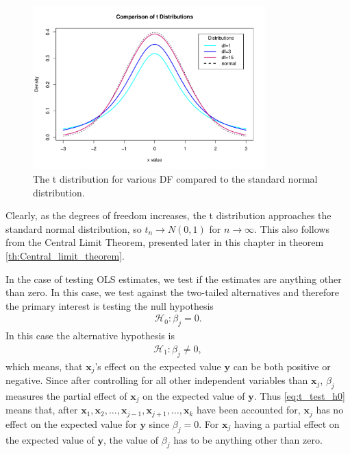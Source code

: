 \begin{figure}[H]
    \centering
    \includegraphics[width = 0.8\textwidth]{figures/t_distribution.pdf}
    \caption{The t distribution for various DF compared to the standard normal distribution.}
    \label{fig:t_distribution}
\end{figure}

Clearly, as the degrees of freedom increases, the t distribution approaches the standard normal distribution, so $t_n \rightarrow N(0,1)$ for $n\rightarrow \infty$. This also follows from the Central Limit Theorem, presented later in this chapter in theorem \ref{th:Central_limit_theorem}. 

In the case of testing OLS estimates, we test if the estimates are anything other than zero. In this case, we test against the two-tailed alternatives and therefore the primary interest is testing the null hypothesis
\begin{align} \label{eq:t_test_h0}
    \mathcal{H}_0:\beta_j=0.
\end{align}
In this case the alternative hypothesis is
\begin{align} \label{eq:t_test_ha}
    \mathcal{H}_1 : \beta_j \neq 0,
\end{align}
which means, that $\textbf{x}_j$'s effect on the expected value $\textbf{y}$ can be both positive or negative.
Since after controlling for all other independent variables than $\textbf{x}_j$, $\beta_j$ measures the partial effect of $\textbf{x}_j$ on the expected value of $\textbf{y}$. 
Thus \eqref{eq:t_test_h0} means that, after $\textbf{x}_1,\textbf{x}_2, \ldots, \textbf{x}_{j-1}, \textbf{x}_{j+1}, \ldots, \textbf{x}_k$ have been accounted for, $\textbf{x}_j$ has no effect on the expected value for $\textbf{y}$ since $\beta_j=0$. 
For $\textbf{x}_j$ having a partial effect on the expected value of $\textbf{y}$, the value of $\beta_j$ has to be anything other than zero.

